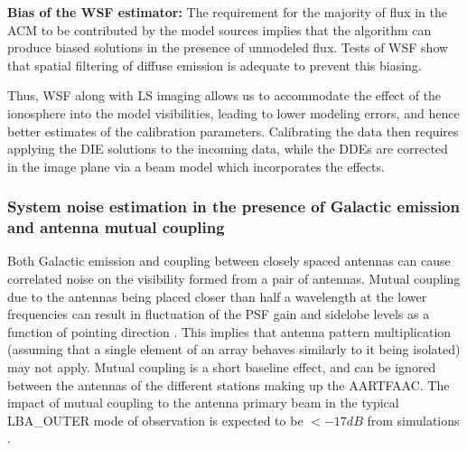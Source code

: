 \documentclass{aa}
\begin{document}
\textbf{Bias of the WSF estimator:} The  requirement for the majority of flux in
the ACM  to be contributed by the  model sources implies that  the algorithm can
produce biased solutions  in the presence of unmodeled flux.   Tests of WSF show
that spatial filtering of diffuse emission is adequate to prevent this biasing.

Thus,  WSF along with  LS imaging  allows us  to accommodate  the effect  of the
ionosphere into  the model visibilities,  leading to lower modeling  errors, and
hence better estimates of the calibration parameters.  Calibrating the data then
requires applying  the DIE solutions  to the incoming  data, while the  DDEs are
corrected in the image plane via a beam model which incorporates the effects.

\subsubsection{\label{sub:System-noise-estimation}System noise estimation in the
presence of Galactic emission and antenna mutual coupling}

Both Galactic  emission and coupling  between closely spaced antennas  can cause
correlated  noise on  the visibility  formed from  a pair  of  antennas. Mutual
coupling due to  the antennas being placed closer than half  a wavelength at the
lower frequencies can result in fluctuation  of the PSF gain and sidelobe levels
as a function of pointing direction \citep{agrawal1972mutual}.  This implies that
antenna  pattern multiplication  (assuming that  a  single element  of an  array
behaves similarly  to it  being isolated)  may not apply.  Mutual coupling  is a
short baseline effect, and can be  ignored between the antennas of the different
stations making  up the AARTFAAC. The  impact of mutual coupling  to the antenna
primary beam  in the typical  LBA\_OUTER mode of  observation is expected  to be
$<-17dB$ from simulations \citep{wijnholds2011situ}.
\end{document}
